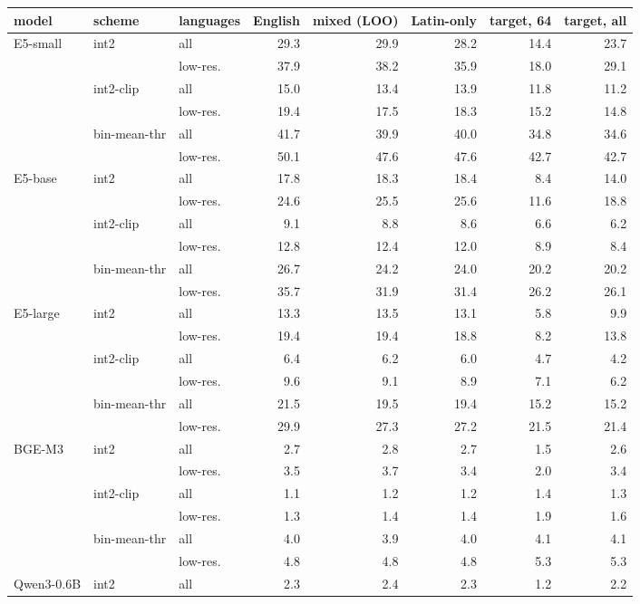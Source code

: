 \begin{table}[t]\centering\footnotesize
\begin{tabular}{lllrrrrr}
\toprule
model & scheme & languages & English & mixed (LOO) & Latin-only & target, 64 & target, all \\
\midrule
E5-small & int2 & all & 29.3 & 29.9 & 28.2 & 14.4 & 23.7 \\
 &  & low-res. & 37.9 & 38.2 & 35.9 & 18.0 & 29.1 \\
 & int2-clip & all & 15.0 & 13.4 & 13.9 & 11.8 & 11.2 \\
 &  & low-res. & 19.4 & 17.5 & 18.3 & 15.2 & 14.8 \\
 & bin-mean-thr & all & 41.7 & 39.9 & 40.0 & 34.8 & 34.6 \\
 &  & low-res. & 50.1 & 47.6 & 47.6 & 42.7 & 42.7 \\
\midrule
E5-base & int2 & all & 17.8 & 18.3 & 18.4 & 8.4 & 14.0 \\
 &  & low-res. & 24.6 & 25.5 & 25.6 & 11.6 & 18.8 \\
 & int2-clip & all & 9.1 & 8.8 & 8.6 & 6.6 & 6.2 \\
 &  & low-res. & 12.8 & 12.4 & 12.0 & 8.9 & 8.4 \\
 & bin-mean-thr & all & 26.7 & 24.2 & 24.0 & 20.2 & 20.2 \\
 &  & low-res. & 35.7 & 31.9 & 31.4 & 26.2 & 26.1 \\
\midrule
E5-large & int2 & all & 13.3 & 13.5 & 13.1 & 5.8 & 9.9 \\
 &  & low-res. & 19.4 & 19.4 & 18.8 & 8.2 & 13.8 \\
 & int2-clip & all & 6.4 & 6.2 & 6.0 & 4.7 & 4.2 \\
 &  & low-res. & 9.6 & 9.1 & 8.9 & 7.1 & 6.2 \\
 & bin-mean-thr & all & 21.5 & 19.5 & 19.4 & 15.2 & 15.2 \\
 &  & low-res. & 29.9 & 27.3 & 27.2 & 21.5 & 21.4 \\
\midrule
BGE-M3 & int2 & all & 2.7 & 2.8 & 2.7 & 1.5 & 2.6 \\
 &  & low-res. & 3.5 & 3.7 & 3.4 & 2.0 & 3.4 \\
 & int2-clip & all & 1.1 & 1.2 & 1.2 & 1.4 & 1.3 \\
 &  & low-res. & 1.3 & 1.4 & 1.4 & 1.9 & 1.6 \\
 & bin-mean-thr & all & 4.0 & 3.9 & 4.0 & 4.1 & 4.1 \\
 &  & low-res. & 4.8 & 4.8 & 4.8 & 5.3 & 5.3 \\
\midrule
Qwen3-0.6B & int2 & all & 2.3 & 2.4 & 2.3 & 1.2 & 2.2 \\

\end{tabular}
\end{table}
